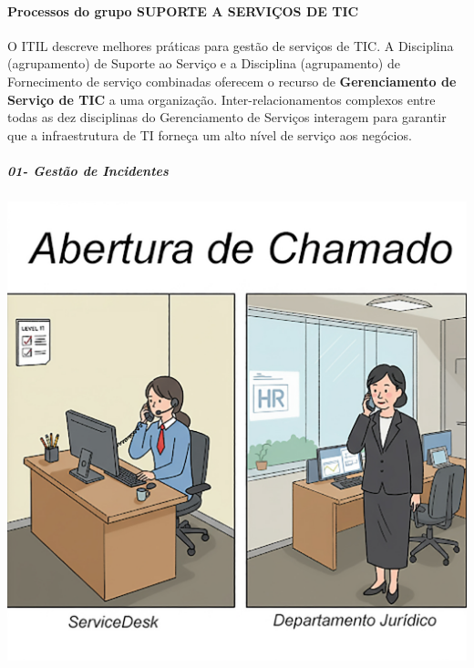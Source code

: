 \documentclass[
]{book}
\begin{document}
\paragraph{Processos do grupo SUPORTE A SERVIÇOS DE TIC}\label{processos-do-grupo-suporte-a-serviuxe7os-de-tic}

O ITIL descreve melhores práticas para gestão de serviços de TIC. A Disciplina (agrupamento) de Suporte ao Serviço e a Disciplina (agrupamento) de Fornecimento de serviço combinadas oferecem o recurso de \textbf{Gerenciamento de Serviço de TIC} a uma organização. Inter-relacionamentos complexos entre todas as dez disciplinas do Gerenciamento de Serviços interagem para garantir que a infraestrutura de TI forneça um alto nível de serviço aos negócios.

\subparagraph{01- Gestão de Incidentes}\label{gestuxe3o-de-incidentes}

\includegraphics{images/InfraEstrutura/ITIL/01-Gerencia_de_Incidentes-01.jpg}
\end{document}
